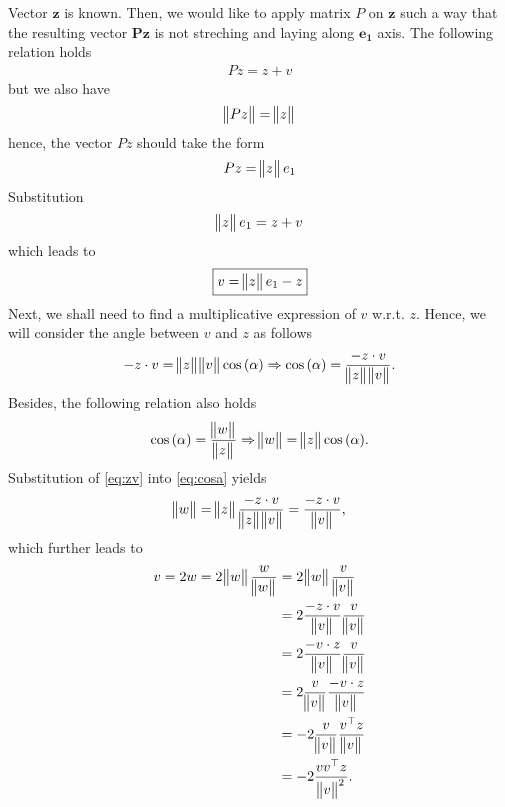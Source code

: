 \documentclass[12pt]{article}
\begin{document}
Vector $\bm{z}$ is known. 
Then, we would like to apply matrix $P$ on $\bm{z}$ such a way that 
the resulting vector $\bm{Pz}$ is not streching and laying along $\bm{e_1}$ axis.
The following relation holds
\begin{align}
	\label{eq:Pzv}
	\boxed{
		Pz = z + v
	}
\end{align}
but we also have
\begin{align}
	\norm[1]{Pz} = \norm[1]{z}
\end{align}
hence, the vector $Pz$ should take the form
\begin{align}
	Pz = \norm[1]{z} e_{1}
\end{align}
Substitution
\begin{align}
	\norm[1]{z} e_{1} = z + v
\end{align}
which leads to 
\begin{align}
	\label{eq:vonly}
	\boxed{
		v = \norm[1]{z} e_{1} - z
	}
\end{align}
Next, we shall need to find a multiplicative expression of $v$ w.r.t. $z$. 
Hence, we will consider the angle between $v$ and $z$ as follows
\begin{align}
	\label{eq:zv}
	-z \cdot v = \norm[1]{z}\norm[1]{v}\cos{(\alpha)}
	\Rightarrow 
	\cos{(\alpha)} = \frac{-z \cdot v}{\norm[1]{z}\norm[1]{v}}.
\end{align}
Besides, the following relation also holds
\begin{align}
	\label{eq:cosa}
	\cos{(\alpha)} = \frac{\norm[1]{w}}{\norm[1]{z}}
	\Rightarrow
	\norm[1]{w} = \norm[1]{z} \cos{(\alpha)}.
\end{align}
Substitution of \eqref{eq:zv} into \eqref{eq:cosa} yields
\begin{align}
	\norm[1]{w}
	= \norm[1]{z} \frac{-z \cdot v}{\norm[1]{z}\norm[1]{v}}
	= \frac{-z \cdot v}{\norm[1]{v}},
\end{align}
which further leads to 
\begin{align}
	\label{eq:vexplicit}
	v 
	= 2w 
	= 2 \norm[1]{w} \frac{w}{\norm[1]{w}}
	 & = 2 \norm[1]{w} \frac{v}{\norm[1]{v}}                     \\
	 & = 2 \frac{-z \cdot v}{\norm[1]{v}} \frac{v}{\norm[1]{v}}  \\ 
	 & = 2 \frac{-v \cdot z}{\norm[1]{v}} \frac{v}{\norm[1]{v}}  \\
	 & = 2 \frac{v}{\norm[1]{v}} \frac{-v \cdot z}{\norm[1]{v}}  \\
	 & = -2 \frac{v}{\norm[1]{v}} \frac{v^{\top} z}{\norm[1]{v}} \\
	 & = -2 \frac{vv^{\top} z}{\norm[1]{v}^2}.
\end{align}
\end{document}

